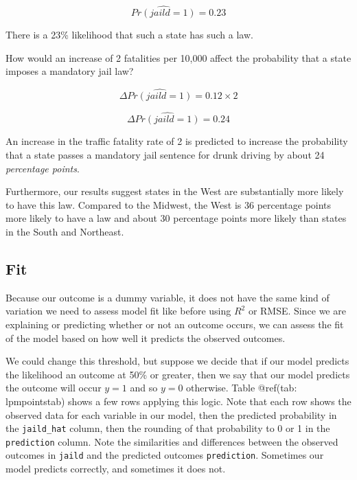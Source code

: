 \documentclass[
]{book}
\begin{document}
\[\hat{Pr(jaild=1)}=0.23\]

There is a 23\% likelihood that such a state has such a law.

How would an increase of 2 fatalities per 10,000 affect the probability that a state imposes a mandatory jail law?

\[\Delta \hat{Pr(jaild=1)}=0.12 \times 2\]

\[\Delta \hat{Pr(jaild=1)}=0.24\]

An increase in the traffic fatality rate of 2 is predicted to increase the probability that a state passes a mandatory jail sentence for drunk driving by about 24 \emph{percentage points}.

Furthermore, our results suggest states in the West are substantially more likely to have this law. Compared to the Midwest, the West is 36 percentage points more likely to have a law and about 30 percentage points more likely than states in the South and Northeast.

\hypertarget{fit}{%
\subsection{Fit}\label{fit}}

Because our outcome is a dummy variable, it does not have the same kind of variation we need to assess model fit like before using \(R^2\) or RMSE. Since we are explaining or predicting whether or not an outcome occurs, we can assess the fit of the model based on how well it predicts the observed outcomes.

We could change this threshold, but suppose we decide that if our model predicts the likelihood an outcome at 50\% or greater, then we say that our model predicts the outcome will occur \(y=1\) and so \(y=0\) otherwise. Table @ref(tab: lpmpointstab) shows a few rows applying this logic. Note that each row shows the observed data for each variable in our model, then the predicted probability in the \texttt{jaild\_hat} column, then the rounding of that probability to 0 or 1 in the \texttt{prediction} column. Note the similarities and differences between the observed outcomes in \texttt{jaild} and the predicted outcomes \texttt{prediction}. Sometimes our model predicts correctly, and sometimes it does not.
\end{document}
